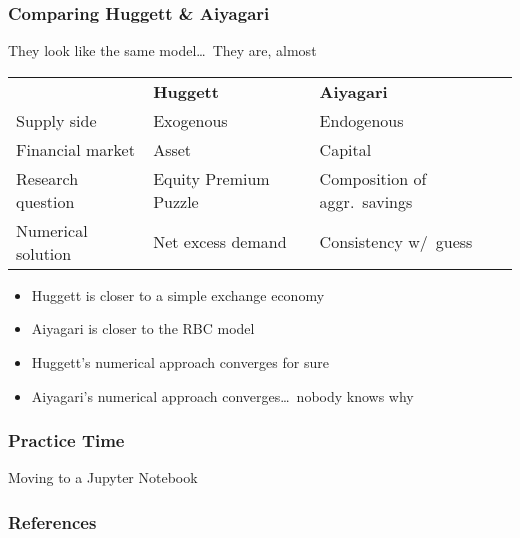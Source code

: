 \documentclass[10pt, aspectratio=1610, natbib, handout]{beamer}
\begin{document}
  \begin{frame}
    \frametitle{Comparing Huggett \& Aiyagari}

    They look like the same model\dots\ They are, almost

    \vfill\pause

    \begin{table}
      \centering
      \begin{tabular}{lll}
        \toprule
        & \textbf{Huggett} & \textbf{Aiyagari} \\
        \cmidrule{2-3}
        Supply side & Exogenous & Endogenous \\
        Financial market & Asset & Capital \\
        Research question & Equity Premium Puzzle & Composition of aggr.~savings \\
        Numerical solution & Net excess demand & Consistency w/~guess \\
        \bottomrule
      \end{tabular}
    \end{table}

    \vfill\pause

    \begin{itemize}
      \item Huggett is closer to a simple exchange economy
      \item Aiyagari is closer to the RBC model
      \item Huggett's numerical approach converges for sure
      \item Aiyagari's numerical approach converges\dots\ nobody knows why
    \end{itemize}

  \end{frame}

  \begin{frame}
    \frametitle{Practice Time}

    Moving to a Jupyter Notebook

  \end{frame}

  \appendix


  \begin{frame}
    \frametitle{References}

    
    

  \end{frame}
\end{document}
